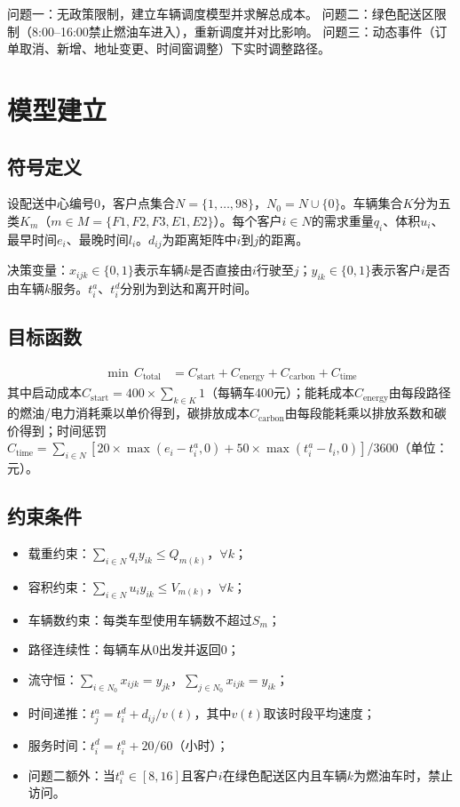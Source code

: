\documentclass[11pt,a4paper]{article}
\begin{document}
问题一：无政策限制，建立车辆调度模型并求解总成本。
问题二：绿色配送区限制（8:00–16:00禁止燃油车进入），重新调度并对比影响。
问题三：动态事件（订单取消、新增、地址变更、时间窗调整）下实时调整路径。

\section{模型建立}

\subsection{符号定义}
设配送中心编号0，客户点集合$N=\{1,\dots,98\}$，$N_0=N\cup\{0\}$。车辆集合$K$分为五类$K_m$（$m\in M=\{F1,F2,F3,E1,E2\}$）。每个客户$i\in N$的需求重量$q_i$、体积$u_i$、最早时间$e_i$、最晚时间$l_i$。$d_{ij}$为距离矩阵中$i$到$j$的距离。

决策变量：$x_{ijk}\in\{0,1\}$表示车辆$k$是否直接由$i$行驶至$j$；$y_{ik}\in\{0,1\}$表示客户$i$是否由车辆$k$服务。$t_i^a$、$t_i^d$分别为到达和离开时间。

\subsection{目标函数}
\begin{align}
\min\, C_{\text{total}} &= C_{\text{start}} + C_{\text{energy}} + C_{\text{carbon}} + C_{\text{time}} \label{eq:obj}
\end{align}
其中启动成本$C_{\text{start}}=400\times\sum_{k\in K}1$（每辆车400元）；能耗成本$C_{\text{energy}}$由每段路径的燃油/电力消耗乘以单价得到，碳排放成本$C_{\text{carbon}}$由每段能耗乘以排放系数和碳价得到；时间惩罚$C_{\text{time}}=\sum_{i\in N}[20\times\max(e_i-t_i^a,0)+50\times\max(t_i^a-l_i,0)]$/3600（单位：元）。

\subsection{约束条件}
\begin{itemize}
    \item 载重约束：$\sum_{i\in N}q_i y_{ik}\le Q_{m(k)}$，$\forall k$；
    \item 容积约束：$\sum_{i\in N}u_i y_{ik}\le V_{m(k)}$，$\forall k$；
    \item 车辆数约束：每类车型使用车辆数不超过$S_m$；
    \item 路径连续性：每辆车从0出发并返回0；
    \item 流守恒：$\sum_{i\in N_0}x_{ijk}=y_{jk}$，$\sum_{j\in N_0}x_{ijk}=y_{ik}$；
    \item 时间递推：$t_j^a = t_i^d + d_{ij}/v(t)$，其中$v(t)$取该时段平均速度；
    \item 服务时间：$t_i^d = t_i^a + 20/60$（小时）；
    \item 问题二额外：当$t_i^a\in[8,16]$且客户$i$在绿色配送区内且车辆$k$为燃油车时，禁止访问。
\end{itemize}
\end{document}
